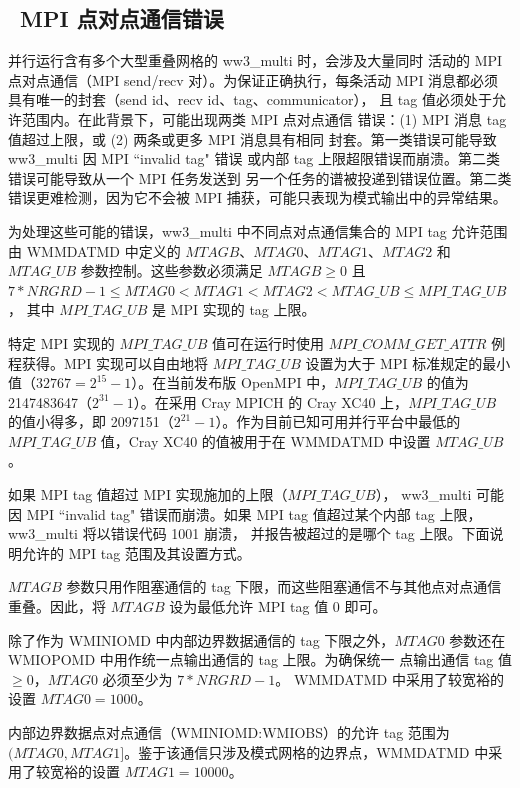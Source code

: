
\vssub
\subsection{~MPI 点对点通信错误}
\vssub

并行运行含有多个大型重叠网格的 {\file ww3\_multi} 时，会涉及大量同时
活动的 MPI 点对点通信（MPI send/recv 对）。为保证正确执行，每条活动
MPI 消息都必须具有唯一的封套（send id、recv id、tag、communicator），
且 tag 值必须处于允许范围内。在此背景下，可能出现两类 MPI 点对点通信
错误：(1) MPI 消息 tag 值超过上限，或 (2) 两条或更多 MPI 消息具有相同
封套。第一类错误可能导致 {\file ww3\_multi} 因 MPI ``invalid tag" 错误
或内部 tag 上限超限错误而崩溃。第二类错误可能导致从一个 MPI 任务发送到
另一个任务的谱被投递到错误位置。第二类错误更难检测，因为它不会被 MPI
捕获，可能只表现为模式输出中的异常结果。

为处理这些可能的错误，{\file ww3\_multi} 中不同点对点通信集合的 MPI tag
允许范围由 {\file WMMDATMD} 中定义的 $MTAGB$、$MTAG0$、$MTAG1$、$MTAG2$
和 $MTAG\_UB$ 参数控制。这些参数必须满足
$MTAGB \geq 0$ 且
$7*NRGRD-1 \leq MTAG0 < MTAG1 < MTAG2 < MTAG\_UB \leq MPI\_TAG\_UB$，
其中 $MPI\_TAG\_UB$ 是 MPI 实现的 tag 上限。

特定 MPI 实现的 $MPI\_TAG\_UB$ 值可在运行时使用
$MPI\_COMM\_GET\_ATTR$ 例程获得。MPI 实现可以自由地将 $MPI\_TAG\_UB$
设置为大于 MPI 标准规定的最小值（$32767 = 2^{15}-1$）。在当前发布版
OpenMPI 中，$MPI\_TAG\_UB$ 的值为 2147483647（$2^{31}-1$）。在采用
Cray MPICH 的 Cray XC40 上，$MPI\_TAG\_UB$ 的值小得多，即
2097151（$2^{21}-1$）。作为目前已知可用并行平台中最低的
$MPI\_TAG\_UB$ 值，Cray XC40 的值被用于在 {\file WMMDATMD} 中设置
$MTAG\_UB$。

如果 MPI tag 值超过 MPI 实现施加的上限（$MPI\_TAG\_UB$），
{\file ww3\_multi} 可能因 MPI ``invalid tag" 错误而崩溃。如果 MPI tag
值超过某个内部 tag 上限，{\file ww3\_multi} 将以错误代码 1001 崩溃，
并报告被超过的是哪个 tag 上限。下面说明允许的 MPI tag 范围及其设置方式。

$MTAGB$ 参数只用作阻塞通信的 tag 下限，而这些阻塞通信不与其他点对点通信
重叠。因此，将 $MTAGB$ 设为最低允许 MPI tag 值 0 即可。

除了作为 {\file WMINIOMD} 中内部边界数据通信的 tag 下限之外，$MTAG0$
参数还在 {\file WMIOPOMD} 中用作统一点输出通信的 tag 上限。为确保统一
点输出通信 tag 值 $\geq 0$，$MTAG0$ 必须至少为 $7*NRGRD-1$。
{\file WMMDATMD} 中采用了较宽裕的设置 $MTAG0 = 1000$。

内部边界数据点对点通信（{\file WMINIOMD:WMIOBS}）的允许 tag 范围为
$(MTAG0,MTAG1]$。鉴于该通信只涉及模式网格的边界点，{\file WMMDATMD}
中采用了较宽裕的设置 $MTAG1 = 10000$。

